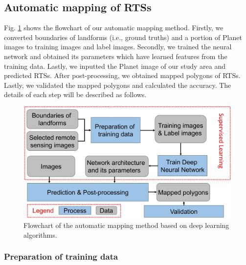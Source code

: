 \documentclass[preprint,12pt,authoryear]{elsarticle}
\begin{document}
\subsection{Automatic mapping of RTSs}
\label{subsec_auto_mapping}

Fig. \ref{fig_flowchart} shows the flowchart of our automatic mapping method. Firstly, we converted boundaries of landforms (i.e., ground truths) and a portion of Planet images to training images and label images. Secondly, we trained the neural network and obtained its parameters which have learned features from the training data. Lastly, we inputted the Planet image of our study area and predicted RTSs. After post-processing, we obtained mapped polygons of RTSs. Lastly, we validated the mapped polygons and calculated the accuracy. The details of each step will be described as follows. %

\begin{figure}[ht]
	\centering
	\includegraphics[width=12cm]{figures/flowchart_trim.jpg}
	\caption{Flowchart of the automatic mapping method based on deep learning algorithms.}
	\label{fig_flowchart}
\end{figure}

\subsubsection{Preparation of training data}
\label{subsubsec_pre_trainingdata}
\end{document}
